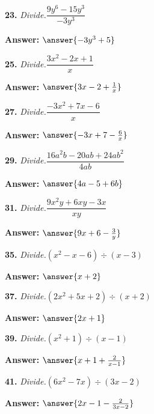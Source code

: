 \documentclass{ximera}
\begin{document}
\begin{problem}
\textbf{23.} \emph{Divide.}\quad $\dfrac{9y^6 - 15y^3}{-3y^3}$

\textbf{Answer:} $\answer{-3y^3 +5}$
\end{problem}

\begin{problem}
\textbf{25.} \emph{Divide.}\quad $\dfrac{3x^2 - 2x + 1}{x}$

\textbf{Answer:} $\answer{3x -2 +\frac{1}{x}}$
\end{problem}

\begin{problem}
\textbf{27.} \emph{Divide.}\quad $\dfrac{-3x^2 + 7x - 6}{x}$

\textbf{Answer:} $\answer{-3x +7 -\frac{6}{x}}$
\end{problem}

\begin{problem}
\textbf{29.} \emph{Divide.}\quad $\dfrac{16a^2b - 20ab + 24ab^2}{4ab}$

\textbf{Answer:} $\answer{4a -5 +6b}$
\end{problem}

\begin{problem}
\textbf{31.} \emph{Divide.}\quad $\dfrac{9x^2y + 6xy - 3x}{xy}$

\textbf{Answer:} $\answer{9x +6 -\frac{3}{y}}$
\end{problem}

\begin{problem}
\textbf{35.} \emph{Divide.}\quad $(x^2 - x - 6) \div (x - 3)$

\textbf{Answer:} $\answer{x +2}$
\end{problem}

\begin{problem}
\textbf{37.} \emph{Divide.}\quad $(2x^2 + 5x + 2) \div (x + 2)$

\textbf{Answer:} $\answer{2x +1}$
\end{problem}

\begin{problem}
\textbf{39.} \emph{Divide.}\quad $(x^2 + 1) \div (x - 1)$

\textbf{Answer:} $\answer{x +1 +\frac{2}{x-1}}$
\end{problem}

\begin{problem}
\textbf{41.} \emph{Divide.}\quad $(6x^2 - 7x) \div (3x - 2)$

\textbf{Answer:} $\answer{2x -1 -\frac{2}{3x-2}}$
\end{problem}
\end{document}
